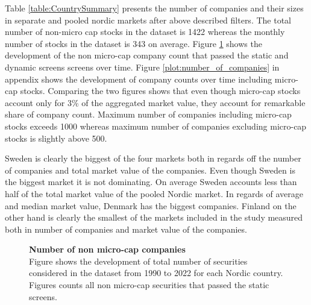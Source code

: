 \documentclass{article}
\begin{document}
Table \ref{table:CountrySummary} presents the number of companies and their sizes in separate and pooled nordic markets after above described filters. The total number of non-micro cap stocks in the dataset is 1422 whereas the monthly number of stocks in the dataset is 343 on average. Figure \ref{plot:number_of_companies_wo_micro} shows the development of the non micro-cap company count that passed the static and dynamic screens screens over time. Figure \ref{plot:number_of_companies} in appendix shows the development of company counts over time including micro-cap stocks. Comparing the two figures shows that even though micro-cap stocks account only for 3\% of the aggregated market value, they account for remarkable share of company count. Maximum number of companies including micro-cap stocks exceeds 1000 whereas maximum number of companies excluding micro-cap stocks is slightly above 500. \par

Sweden is clearly the biggest of the four markets both in regards off the number of companies and total market value of the companies. Even though Sweden is the biggest market it is not dominating. On average Sweden accounts less than half of the total market value of the pooled Nordic market. In regards of average  and median market value, Denmark has the biggest companies. Finland on the other hand is clearly the smallest of the markets included in the study measured both in number of companies and market value of the companies. \par

\begin{figure}[ht]
\centering
\caption[Number of non micro-cap companies]{\textbf{Number of non micro-cap companies}\\ Figure shows the development of total number of securities considered in the dataset from 1990 to 2022 for each Nordic country. Figures counts all non micro-cap securities that passed the static screens.}

\label{plot:number_of_companies_wo_micro}
\end{figure}
\end{document}
